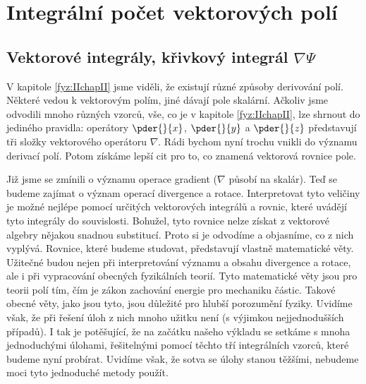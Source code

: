\chapter{Integrální počet vektorových polí}\label{fyz:IIchapIII}
\minitoc

  \section{Vektorové integrály, křivkový integrál \texorpdfstring{\(\nabla\Psi\)}{nabla 
  psi}}\label{fyz:IIchapIIIsecI}
    V kapitole \ref{fyz:IIchapII} jsme viděli, že existují různé způsoby derivování polí. Některé 
    vedou k vektorovým polím, jiné dávají pole skalární. Ačkoliv jsme odvodili mnoho různých 
    vzorců, vše, co je v kapitole \ref{fyz:IIchapII}, lze shrnout do jediného pravidla: operátory 
    \(\pder{ }{x}\), \(\pder{ }{y}\) a \(\pder{ }{z}\) představují tři složky vektorového operátoru 
    \(\nabla\). Rádi bychom nyní trochu vnikli do významu derivací polí. Potom získáme lepší cit 
    pro to, co znamená vektorová rovnice pole.
    
    Již jsme se zmínili o významu operace gradient (\(\nabla\) působí na skalár). Teď se budeme  
    zajímat o význam operací divergence a rotace. Interpretovat tyto veličiny je možné nejlépe 
    pomocí určitých vektorových integrálů a rovnic, které uvádějí tyto integrály do souvislosti. 
    Bohužel, tyto rovnice nelze získat z vektorové algebry nějakou snadnou substitucí. Proto si je 
    odvodíme a objasníme, co z nich vyplývá. Rovnice, které budeme studovat, představují vlastně 
    matematické věty. Užitečné budou nejen při interpretování významu a obsahu divergence a rotace, 
    ale i při vypracování obecných fyzikálních teorií. Tyto matematické věty jsou pro teorii polí 
    tím, čím je zákon zachování energie pro mechaniku částic. Takové obecné věty, jako jsou tyto, 
    jsou důležité pro hlubší porozumění fyziky. Uvidíme však, že při řešení úloh z nich mnoho 
    užitku není (s výjimkou nejjednodušších případů). I tak je potěšující, že na začátku našeho 
    výkladu se setkáme s mnoha jednoduchými úlohami, řešitelnými pomocí těchto tří integrálních 
    vzorců, které budeme nyní probírat. Uvidíme však, že sotva se úlohy stanou těžšími, nebudeme 
    moci tyto jednoduché metody použít.
    
